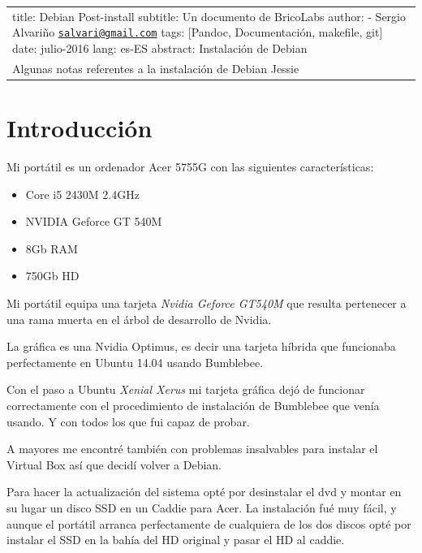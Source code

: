 \documentclass[12pt,spanish,]{scrartcl}
\date{}
\begin{document}
{
\hypersetup{linkcolor=black}
\setcounter{tocdepth}{3}
\tableofcontents
}
\begin{longtable}[]{@{}l@{}}
\toprule
\begin{minipage}[t]{0.03\columnwidth}\raggedright\strut
title: Debian Post-install subtitle: Un documento de BricoLabs author: -
Sergio Alvariño
\href{mailto:salvari@gmail.com}{\nolinkurl{salvari@gmail.com}} tags:
{[}Pandoc, Documentación, makefile, git{]} date: julio-2016 lang: es-ES
abstract: \textbar{} Instalación de Debian\strut
\end{minipage}\tabularnewline
\begin{minipage}[t]{0.03\columnwidth}\raggedright\strut
Algunas notas referentes a la instalación de Debian Jessie\strut
\end{minipage}\tabularnewline
\bottomrule
\end{longtable}

\section{Introducción}\label{introducciuxf3n}

Mi portátil es un ordenador Acer 5755G con las siguientes
características:

\begin{itemize}
\item
  Core i5 2430M 2.4GHz
\item
  NVIDIA Geforce GT 540M
\item
  8Gb RAM
\item
  750Gb HD
\end{itemize}

Mi portátil equipa una tarjeta \emph{Nvidia Geforce GT540M} que resulta
pertenecer a una rama muerta en el árbol de desarrollo de Nvidia.

La gráfica es una Nvidia Optimus, es decir una tarjeta híbrida que
funcionaba perfectamente en Ubuntu 14.04 usando Bumblebee.

Con el paso a Ubuntu \emph{Xenial Xerus} mi tarjeta gráfica dejó de
funcionar correctamente con el procedimiento de instalación de Bumblebee
que venía usando. Y con todos los que fui capaz de probar.

A mayores me encontré también con problemas insalvables para instalar el
Virtual Box así que decidí volver a Debian.

Para hacer la actualización del sistema opté por desinstalar el dvd y
montar en su lugar un disco SSD en un Caddie para Acer. La instalación
fué muy fácil, y aunque el portátil arranca perfectamente de cualquiera
de los dos discos opté por instalar el SSD en la bahía del HD original y
pasar el HD al caddie.
\end{document}
